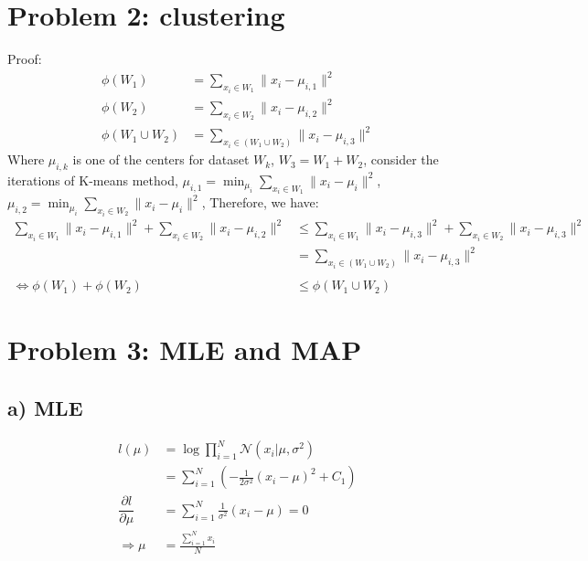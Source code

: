 \documentclass[a4paper,12pt]{article}
\begin{document}
\section{Problem 2:  clustering}
Proof: 
\begin{align}
\phi(W_1) &= \sum_{x_i \in W_1} \lVert x_i - \mu_{i,1}\rVert^2 \nonumber \\
\phi(W_2) &= \sum_{x_i \in W_2} \lVert x_i - \mu_{i,2}\rVert^2 \nonumber \\
\phi(W_1 \cup W_2) &= \sum_{x_i \in (W_1 \cup W_2)} \lVert x_i - \mu_{i,3}\rVert^2 \nonumber 
\end{align}
Where $\mu_{i,k}$ is one of the centers for dataset $W_k$, $W_3 = W_1 + W_2$,  consider the iterations of K-means method, $\mu_{i,1} = \min_{\mu_i}\sum_{x_i \in W_1} \lVert x_i - \mu_i\rVert^2$, $\mu_{i,2} = \min_{\mu_i}\sum_{x_i \in W_2} \lVert x_i - \mu_i\rVert^2$, Therefore, we have:
\begin{align}
\sum_{x_i \in W_1} \lVert x_i - \mu_{i,1}\rVert^2  +  \sum_{x_i \in W_2} \lVert x_i - \mu_{i,2}\rVert^2  &\leqslant   \sum_{x_i \in W_1} \lVert x_i - \mu_{i,3}\rVert^2 +\sum_{x_i \in W_2} \lVert x_i - \mu_{i,3}\rVert^2  \nonumber \\
& = \sum_{x_i \in (W_1 \cup W_2)} \lVert x_i - \mu_{i,3}\rVert^2 \nonumber \\
\qquad \nonumber \\
\Leftrightarrow \phi(W_1)+\phi(W_2)& \leqslant \phi(W_1 \cup W_2) \nonumber
\end{align}

\section{Problem 3: MLE and MAP}
\subsection{a) MLE}
\begin{align}
l(\mu) &= \log \prod_{i = 1}^{N} \mathcal{N}(x_i \rvert \mu, \sigma^2) \nonumber \\
& = \sum_{i = 1}^{N} ( -\frac{1}{2\sigma^2} (x_i - \mu)^2  +C_1 ) \nonumber \\
\dfrac{\partial l}{\partial \mu} &= \sum_{i = 1}^{N}  \frac{1}{\sigma^2} (x_i - \mu) = 0 \nonumber \\
\Rightarrow \mu &= \frac{\sum_{i = 1}^{N} x_i}{N} \nonumber 
\end{align}
\end{document}
